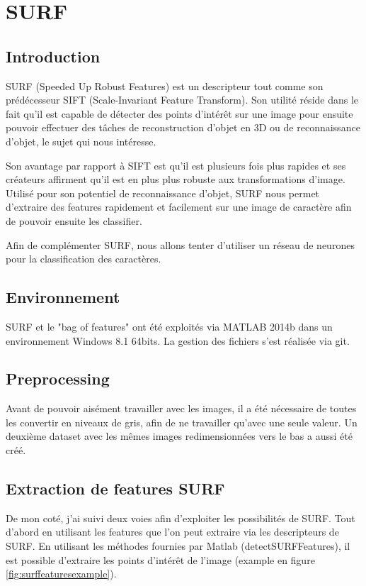 \chapter{SURF}

\section{Introduction}

SURF (Speeded Up Robust Features) est un descripteur tout comme son prédécesseur SIFT (Scale-Invariant Feature Transform). Son utilité réside dans le fait qu'il est capable de détecter des points d'intérêt sur une image pour ensuite pouvoir effectuer des tâches de reconstruction d'objet en 3D ou de reconnaissance d'objet, le sujet qui nous intéresse.

Son avantage par rapport à SIFT est qu'il est plusieurs fois plus rapides et ses créateurs affirment qu'il est en plus plus robuste aux transformations d'image. Utilisé pour son potentiel de reconnaissance d'objet, SURF nous permet d'extraire des features rapidement et facilement sur une image de caractère afin de pouvoir ensuite les classifier.

Afin de complémenter SURF, nous allons tenter d'utiliser un réseau de neurones pour la classification des caractères.

\section{Environnement}

SURF et le "bag of features" ont été exploités via MATLAB 2014b dans un environnement Windows 8.1 64bits. La gestion des fichiers s'est réalisée via git.

\section{Preprocessing}

Avant de pouvoir aisément travailler avec les images, il a été nécessaire de toutes les convertir en niveaux de gris, afin de ne travailler qu'avec une seule valeur. Un deuxième dataset avec les mêmes images redimensionnées vers le bas a aussi été créé.

\section{Extraction de features SURF}

De mon coté, j'ai suivi deux voies afin d'exploiter les possibilités de SURF. Tout d'abord en utilisant les features que l'on peut extraire via les descripteurs de SURF. En utilisant les méthodes fournies par Matlab (detectSURFFeatures), il est possible d'extraire les points d'intérêt de l'image (example en figure \ref{fig:surffeaturesexample}).

